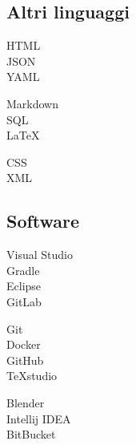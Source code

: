 \documentclass[curriculum-vitae]{subfiles}
\begin{document}
		\subsection*{Altri linguaggi}
			\begin{minipage}[t]{.3\textwidth}
				HTML \hfill {}\\
				JSON \hfill {}\\
				YAML \hfill {}\\ %
			\end{minipage}
			\hfill
			\begin{minipage}[t]{.3\textwidth}
				Markdown \hfill {}\\
				SQL \hfill {}\\
				\LaTeX \hfill {}\\ %
			\end{minipage}
			\hfill
			\begin{minipage}[t]{.3\textwidth}
				CSS \hfill {}\\
				XML \hfill {}\\ %
			\end{minipage}
		
		\subsection*{Software}
			\begin{minipage}[t]{.3\textwidth}
				Visual Studio \hfill {}\\
				Gradle \hfill {}\\
				Eclipse \hfill {}\\
				GitLab \hfill {}\\  %
			\end{minipage}
			\hfill
			\begin{minipage}[t]{.3\textwidth}
				Git \hfill {}\\
				Docker \hfill {}\\
				GitHub \hfill {}\\
				TeXstudio \hfill {}\\  %
			\end{minipage}
			\hfill
			\begin{minipage}[t]{.3\textwidth}
				Blender \hfill {}\\
				Intellij IDEA \hfill {}\\
				BitBucket \hfill {}\\ %
			\end{minipage}
\end{document}
